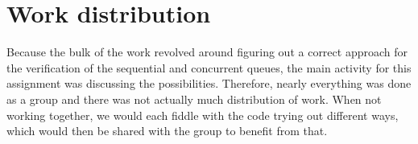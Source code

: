 \section{Work distribution}
Because the bulk of the work revolved around figuring out a correct approach for the verification of the sequential and concurrent queues, the main activity for this assignment was discussing the possibilities. Therefore, nearly everything was done as a group and there was not actually much distribution of work. When not working together, we would each fiddle with the code trying out different ways, which would then be shared with the group to benefit from that.